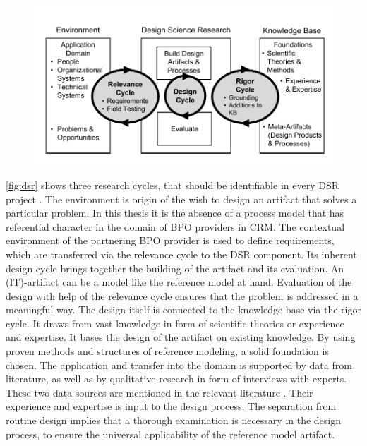 			
\begin{figure}[caption={Design science research cycles}, label={fig:dsr}]
	{	\includegraphics[width=.8\textwidth]{figures/dsr.pdf}
	} \\
\parbox{0.8\textwidth}{}
\end{figure}


\Fig \ref{fig:dsr} shows three research cycles, that should be identifiable in every \acrshort{DSR} project \citep{Hevner2010}. The environment is origin of the wish to design an artifact that solves a particular problem. In this thesis it is the absence of a process model that has referential character in the domain of \acrshort{BPO} providers in \acrshort{CRM}. The contextual environment of the partnering  \acrshort{BPO} provider is used to define requirements, which are transferred via the relevance cycle to the \acrshort{DSR} component. Its inherent design cycle brings together the building of the artifact and its evaluation. An (IT)-artifact can be a model \citep{Hevner2010} like the reference model at hand. Evaluation of the design with help of the relevance cycle ensures that the problem is addressed in a meaningful way. The design itself is connected to the knowledge base via the rigor cycle. It draws from vast knowledge in form of scientific theories or experience and expertise. It bases the design of the artifact on existing knowledge. By using proven methods and structures of reference modeling, a solid foundation is chosen. The application and transfer into the domain is supported by data from literature, as well as by qualitative research in form of interviews with experts. These two data sources are mentioned in the relevant literature \citep[]{thomas2006mang}. Their experience and expertise is input to the design process. The separation from routine design implies that a thorough examination is necessary in the design process, to ensure the universal applicability of the reference model artifact. 


